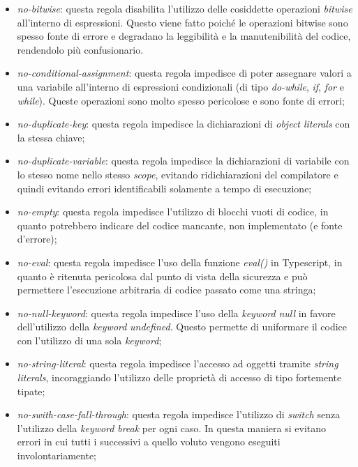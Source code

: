 \begin{itemize}
                \item \textit{no-bitwise}: questa regola disabilita l'utilizzo delle cosiddette operazioni \textit{bitwise} all'interno di espressioni. Questo viene fatto poiché le operazioni bitwise sono spesso fonte di errore e degradano la leggibilit\`a e la manutenibilità del codice, rendendolo pi\`u confusionario.
                \item \textit{no-conditional-assignment}: questa regola impedisce di poter assegnare valori a una variabile all'interno di espressioni condizionali (di tipo \textit{do-while}, \textit{if}, \textit{for} e \textit{while}). Queste operazioni sono molto spesso pericolose e sono fonte di errori;
                \item \textit{no-duplicate-key}: questa regola impedisce la dichiarazioni di \textit{object literals} con la stessa chiave;
                \item \textit{no-duplicate-variable}: questa regola impedisce la dichiarazioni di variabile con lo stesso nome nello stesso \textit{scope}, evitando ridichiarazioni del compilatore e quindi evitando errori identificabili solamente a tempo di esecuzione;
                \item \textit{no-empty}: questa regola impedisce l'utilizzo di blocchi vuoti di codice, in quanto potrebbero indicare del codice mancante, non implementato (e fonte d'errore);
                \item \textit{no-eval}: questa regola impedisce l'uso della funzione \textit{eval()} in Typescript, in quanto \`e ritenuta pericolosa dal punto di vista della sicurezza e pu\`o permettere l'esecuzione arbitraria di codice passato come una stringa;
                \item \textit{no-null-keyword}: questa regola impedisce l'uso della \textit{keyword} \textit{null} in favore dell'utilizzo della \textit{keyword} \textit{undefined}. Questo permette di uniformare il codice con l'utilizzo di una sola \textit{keyword};
                \item \textit{no-string-literal}: questa regola impedisce l'accesso ad oggetti tramite \textit{string literals}, incoraggiando l'utilizzo delle propriet\`a di accesso di tipo fortemente tipate;
                \item \textit{no-swith-case-fall-through}: questa regola impedisce l'utilizzo di \textit{switch} senza l'utilizzo della \textit{keyword} \textit{break} per ogni caso. In questa maniera si evitano errori in cui tutti i  successivi a quello voluto vengono eseguiti involontariamente;

\end{itemize}
